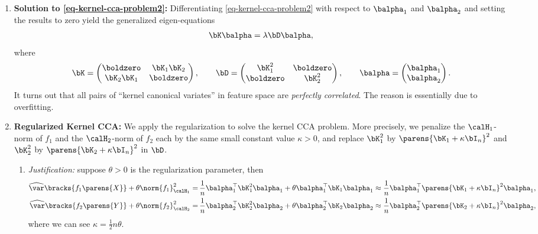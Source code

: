 \documentclass[12pt]{article}
\begin{document}
\begin{enumerate}[label=\textbf{\arabic*.}]
	\item \textbf{Solution to \eqref{eq-kernel-cca-problem2}:} Differentiating \eqref{eq-kernel-cca-problem2} with respect to $\balpha_1$ and $\balpha_2$ and setting the results to zero yield the generalized eigen-equations 
	\begin{align*}
		\bK \balpha = \lambda \bD \balpha, 
	\end{align*}
	where 
	\begin{align*}
		\bK = \begin{pmatrix}
			\boldzero & \bK_1 \bK_2 \\ \bK_2 \bK_1 & \boldzero
		\end{pmatrix}, \qquad 
		\bD = \begin{pmatrix}
			\bK_1^2 & \boldzero \\ \boldzero & \bK_2^2
		\end{pmatrix}, \qquad \balpha = \begin{pmatrix}
			\balpha_1 \\ 
			\balpha_2
		\end{pmatrix}. 
	\end{align*}
	It turns out that all pairs of ``kernel canonical variates'' in feature space are \emph{perfectly correlated}. The reason is essentially due to overfitting. 
	
	\item \textbf{Regularized Kernel CCA:} We apply the regularization to solve the kernel CCA problem. More precisely, we penalize the $\calH_1$-norm of $f_1$ and the $\calH_2$-norm of $f_2$ each by the same small constant value $\kappa > 0$, and replace $\bK_{1}^2$ by $\parens{\bK_1 + \kappa \bI_n}^2$ and $\bK_2^2$ by $\parens{\bK_2 + \kappa \bI_n}^2$ in $\bD$. 
	
	\begin{enumerate}
		\item \textit{Justification:} suppose $\theta > 0$ is the regularization parameter, then 
		\begin{align*}
			\widehat{\var} \bracks{f_1 \parens{X}} + \theta \norm{f_1}_{\calH_1}^2 = & \, \frac{1}{n} \balpha_1^\top \bK_1^2 \balpha_1 + \theta \balpha_1^\top \bK_1 \balpha_1 \approx \frac{1}{n} \balpha_1^\top \parens{\bK_1 + \kappa \bI_n}^2 \balpha_1, \\
			\widehat{\var} \bracks{f_2 \parens{Y}} + \theta \norm{f_2}_{\calH_2}^2 = & \, \frac{1}{n} \balpha_2^\top \bK_2^2 \balpha_2 + \theta \balpha_2^\top \bK_2 \balpha_2 \approx \frac{1}{n} \balpha_2^\top \parens{\bK_2 + \kappa \bI_n}^2 \balpha_2, 
		\end{align*}
		where we can see $\kappa = \frac{1}{2} n \theta$. 
		

\end{enumerate}
\end{enumerate}
\end{document}
